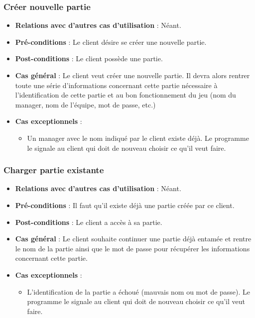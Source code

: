 \documentclass[a4paper,titlepage]{scrreprt}
\begin{document}
    \subsubsection{Créer nouvelle partie}
      \begin{itemize}
        \item \textbf{Relations avec d'autres cas d'utilisation}  : Néant.
        \item \textbf{Pré-conditions} : Le client désire se créer une nouvelle partie.
        \item \textbf{Post-conditions} : Le client possède une partie.
        \item \textbf{Cas général} : Le client veut créer une nouvelle partie. Il devra alors rentrer toute une série d’informations concernant cette partie nécessaire à l’identification de cette partie et au bon fonctionnement du jeu (nom du manager, nom de l’équipe, mot de passe, etc.)
        \item \textbf{Cas exceptionnels} :
          \begin{itemize}
            \item Un manager avec le nom indiqué par le client existe déjà. Le programme le signale au client qui doit de nouveau choisir ce qu'il veut faire.
          \end{itemize}
      \end{itemize}

    \subsubsection{Charger partie existante}
      \begin{itemize}
        \item \textbf{Relations avec d'autres cas d'utilisation}  : Néant.
        \item \textbf{Pré-conditions} : Il faut qu’il existe déjà une partie créée par ce client.
        \item \textbf{Post-conditions} : Le client a accès à sa partie.
        \item \textbf{Cas général} : Le client souhaite continuer une partie déjà entamée et rentre le nom de la partie ainsi que le mot de passe pour récupérer les informations concernant cette partie.
        \item \textbf{Cas exceptionnels} :
          \begin{itemize}
      \item L’identification de la partie a échoué (mauvais nom ou mot de passe). Le programme le signale au client qui doit de nouveau choisir ce qu'il veut faire.
          \end{itemize}
      \end{itemize}
\end{document}
